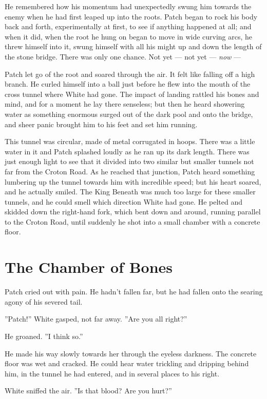 \documentclass[12pt]{book}
\begin{document}
He remembered how his momentum had unexpectedly swung him towards the
enemy when he had first leaped up into the roots. Patch began to rock
his body back and forth, experimentally at first, to see if anything
happened at all; and when it did, when the root he hung on began to
move in wide curving arcs, he threw himself into it, swung himself
with all his might up and down the length of the stone bridge. There
was only one chance. Not yet --- not yet --- \textit{now} ---

Patch let go of the root and soared through the air. It felt like
falling off a high branch. He curled himself into a ball just before
he flew into the mouth of the cross tunnel where White had gone. The
impact of landing rattled his bones and mind, and for a moment he lay
there senseless; but then he heard showering water as something
enormous surged out of the dark pool and onto the bridge, and sheer
panic brought him to his feet and set him running.

This tunnel was circular, made of metal corrugated in hoops. There was
a little water in it and Patch splashed loudly as he ran up its dark
length. There was just enough light to see that it divided into two
similar but smaller tunnels not far from the Croton Road. As he
reached that junction, Patch heard something lumbering up the tunnel
towards him with incredible speed; but his heart soared, and he
actually smiled. The King Beneath was much too large for these smaller
tunnels, and he could smell which direction White had gone. He pelted
and skidded down the right-hand fork, which bent down and around,
running parallel to the Croton Road, until suddenly he shot into a
small chamber with a concrete floor.


\section{The Chamber of Bones}

Patch cried out with pain. He hadn't fallen far, but he had fallen
onto the searing agony of his severed tail.

''Patch!'' White gasped, not far away. ''Are you all right?''

He groaned. ''I think so.''

He made his way slowly towards her through the eyeless darkness. The
concrete floor was wet and cracked. He could hear water trickling and
dripping behind him, in the tunnel he had entered, and in several
places to his right.

White sniffed the air. ''Is that blood? Are you hurt?''
\end{document}
